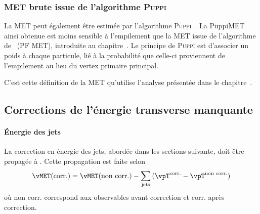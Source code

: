 \subsubsection{MET brute issue de l'algorithme \textsc{Puppi}}
La MET peut également être estimée par l'algorithme \textsc{Puppi}~\cite{PUPPI}.
La \og PuppiMET \fg{} ainsi obtenue est moins sensible à l'empilement que la MET issue de l'algorithme de \PF\ (PF MET), introduite au chapitre~.
Le principe de \textsc{Puppi} est d'associer un poids à chaque particule, lié à la probabilité que celle-ci proviennent de l'empilement au lieu du vertex primaire principal.


C'est cette définition de la MET qu'utilise l'analyse présentée dans le chapitre~.
\subsection{Corrections de l'énergie transverse manquante}\label{chapter-HLO-section-MET-corr}
\paragraph{Énergie des jets}
La correction en énergie des jets, abordée dans les sections suivante, doit être propagée à \MET.
Cette propagation est faite selon
\begin{equation}
\vMET(\text{corr.}) = \vMET(\text{non corr.}) - \sum_\text{jets} \left( \vpT^\text{corr.} - \vpT^\text{non corr.} \right)
\end{equation}
où
\og non corr. \fg{} correspond aux observables avant correction
et
\og corr. \fg{} après correction.
